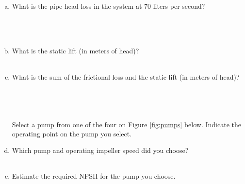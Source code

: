 \documentclass[11pt]{article}
\begin{document}
\begin{enumerate}
\begin{enumerate}[a)]
\item What is the pipe head loss in the system at 70 liters per second?\\
~\\
~\\
~\\
\item What is the static lift (in meters of head)?
~\\
~\\
\item What is the sum of the frictional loss and the static lift (in meters of head)?
~\\
~\\
~\\
~\\
Select a pump from one of the four on Figure \ref{fig:pumps} below.  Indicate the operating point on the pump you select.
~\\
\item Which pump and operating impeller speed did you choose?
~\\
~\\
\item Estimate the required NPSH for the pump you choose.
~\\
~\\
\end{enumerate}


\end{enumerate}
\end{document}
